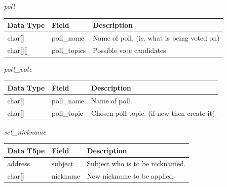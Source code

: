 \documentclass{article}
\begin{document}
\begin{center}
    \Large{\textit{poll}}
\end{center}
\begin{table}[H]
\centering
\begin{tabular}{|p{1.3cm}|p{2.5cm}|p{5.5cm}|}
\hline
\rowcolor{tblgrey} 
Data Type   & Field           & Description                                               \\ \hline
char[\hspace{0.05cm}] & poll\_name      & Name of poll. (ie. what is being voted on)                \\ \hline
char[\hspace{0.05cm}][\hspace{0.05cm}] & poll\_topics    & Possible vote candidates                                  \\ \hline
\end{tabular}
\end{table}

\begin{center}
    \Large{\textit{poll\_vote}}
\end{center}
\begin{table}[H]
\centering
\begin{tabular}{|p{1.3cm}|p{2.5cm}|p{5.5cm}|}
\hline
\rowcolor{tblgrey} 
Data Type & Field           & Description                                               \\ \hline
char[\hspace{0.05cm}] & poll\_name      & Name of poll.                                             \\ \hline
char[\hspace{0.05cm}] & poll\_topic     & Chosen poll topic. (if new then create it)                \\ \hline
\end{tabular}
\end{table}

\newpage

\begin{center}
    \Large{\textit{set\_nickname}}
\end{center}
\begin{table}[H]
\centering
\begin{tabular}{|p{1.3cm}|p{2.5cm}|p{5.5cm}|}
\hline
\rowcolor{tblgrey} 
Data T5pe       & Field           & Description                                               \\ \hline
address         & subject         & Subject who is to be nicknamed.                           \\ \hline
char[\hspace{0.05cm}] & nickname        & New nickname to be applied.                               \\ \hline
\end{tabular}
\end{table}
\end{document}
